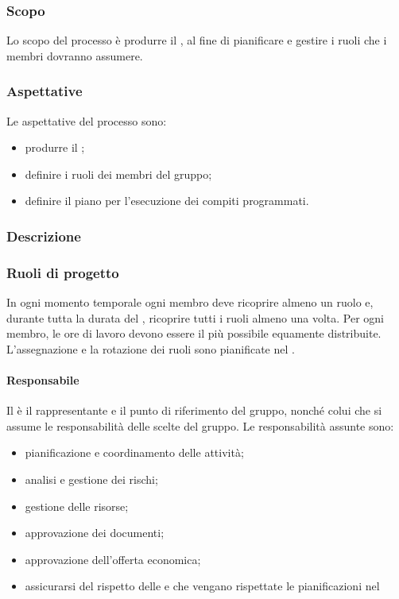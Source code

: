 \subsubsection{Scopo}
Lo scopo del processo è produrre il \PPdoc , al fine di pianificare e gestire i ruoli che i membri dovranno assumere.
\subsubsection{Aspettative}
Le aspettative del processo sono:
 \begin{itemize}
  \item produrre il \PPdoc ;
  \item definire i ruoli dei membri del gruppo;
  \item definire il piano per l'esecuzione dei compiti programmati.
 \end{itemize}
\subsubsection{Descrizione}
 
\subsubsection{Ruoli di progetto}
 In ogni momento temporale ogni membro deve ricoprire almeno un ruolo e, durante tutta la durata del , ricoprire tutti i ruoli almeno una volta. Per ogni membro, le ore di lavoro devono essere il più possibile equamente distribuite. L'assegnazione e la rotazione dei ruoli sono pianificate nel \PPdocRR.
 \paragraph{Responsabile}
 Il \RESP{} è il rappresentante e il punto di riferimento del gruppo, nonché colui che si assume le responsabilità delle scelte del gruppo.
 Le responsabilità assunte sono:
 \begin{itemize}
  \item pianificazione e coordinamento delle attività;
  \item analisi e gestione dei rischi;
  \item gestione delle risorse;
  \item approvazione dei documenti;
  \item approvazione dell'offerta economica;
  \item assicurarsi del rispetto delle \NPdoc{} e che vengano rispettate le pianificazioni nel \PPdoc
 \end{itemize}
